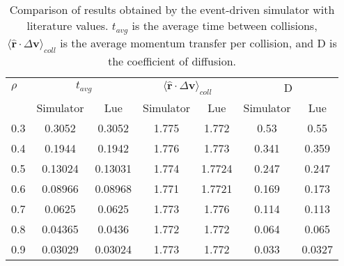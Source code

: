 \documentclass[12pt]{UoAthesis}
\begin{document}
\begin{table} \caption{Comparison of results obtained by the event-driven
simulator with literature values. $t_{avg}$ is the average time between
collisions, $\langle\mathbf{\hat{r}} \cdot \Delta \mathbf{v} \rangle_{coll}$ is
the average momentum transfer per collision, and D is the coefficient of
diffusion.} \label{tab:benchhard} \begin{center} \begin{tabular}{l c c c c c c}
\toprule $\rho$ & \multicolumn{2}{c}{$t_{avg}$} &
\multicolumn{2}{c}{$\langle\mathbf{\hat{r}} \cdot \Delta \mathbf{v}
\rangle_{coll}$} & \multicolumn{2}{c}{D} \\ \cmidrule(rl{0.75em}){2-3}
\cmidrule(rl{0.75em}){4-5} \cmidrule(rl{0.75em}){6-7} & Simulator & Lue &
Simulator & Lue & Simulator & Lue\\ \midrule 0.3 & 0.3052 & 0.3052 & 1.775 &
1.772 & 0.53 & 0.55 \\ 0.4 & 0.1944 & 0.1942 & 1.776 & 1.773 & 0.341 & 0.359 \\
0.5 & 0.13024 & 0.13031 & 1.774 & 1.7724 & 0.247 & 0.247 \\ 0.6 & 0.08966 &
0.08968 & 1.771 & 1.7721 & 0.169 & 0.173 \\ 0.7 & 0.0625 & 0.0625 & 1.773 &
1.776 & 0.114 & 0.113 \\ 0.8 & 0.04365 & 0.0436 & 1.772 & 1.772 & 0.064 & 0.065
\\ 0.9 & 0.03029 & 0.03024 & 1.773 & 1.772 & 0.033 & 0.0327 \\ \bottomrule
\end{tabular} \end{center} \end{table}
\end{document}
